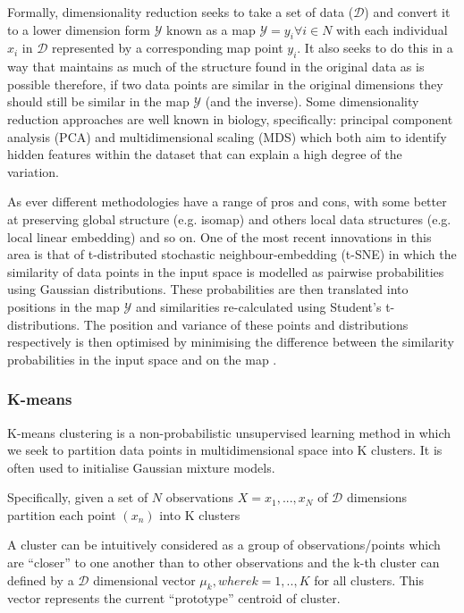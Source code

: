 Formally, dimensionality reduction seeks to take a set of data (\(\mathcal{D}\)) and convert it
to a lower dimension form \(\mathcal{Y}\) known as a map \(\mathcal{Y} = {y_{i} \forall i \in N}\) 
with each individual \(x_{i}\) in \(\mathcal{D}\) represented by a corresponding map point \(y_{i}\). It
also seeks to do this in a way that maintains as much of the structure found in the original data 
as is possible \citep{Maaten2008} therefore, if two data points are similar in the original dimensions
they should still be similar in the map \(\mathcal{Y}\) (and the inverse).
Some dimensionality reduction approaches are well known in biology, specifically: principal component analysis (PCA) 
\citep{hotelling1933analysis} and multidimensional scaling (MDS) \citep{Torgerson1952} which both aim to identify
hidden features within the dataset that can explain a high degree of the variation.  


As ever different methodologies have a range of pros and cons, with
some better at preserving global structure (e.g. isomap) and others local data structures (e.g. local linear embedding) and so on.
One of the most recent innovations in this area is that of t-distributed stochastic neighbour-embedding
(t-SNE) in which the similarity of data points in the input space is modelled as pairwise probabilities 
using Gaussian distributions.
These probabilities are then translated into positions in the map \(\mathcal{Y}\) and similarities re-calculated
using Student's t-distributions.  The position and variance of these points and distributions respectively
is then optimised by minimising the difference between the similarity probabilities in the input space
and on the map \citep{Maaten2008}. %

\subsubsection{K-means}

K-means clustering is a non-probabilistic unsupervised learning 
method in which we seek to partition data points in multidimensional space into 
K clusters. It is often used to initialise Gaussian mixture models.

Specifically, given a set of \(N\) observations \(X = {x_{1},...,x_{N}}\) 
of \(\mathcal{D}\) dimensions partition each point \((x_{n})\) into K clusters %

A cluster can be intuitively considered as a group of observations/points which are 
``closer'' to one another than to other observations and the k-th cluster can 
defined by a \(\mathcal{D}\) dimensional vector \(\mu_{k}, where k=1,..,K\) for all clusters.
This vector represents the current ``prototype'' centroid of cluster. 

